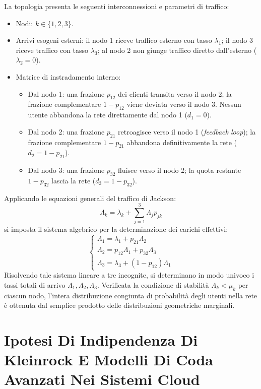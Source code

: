 \documentclass[11pt, a4paper]{article}
\begin{document}
La topologia presenta le seguenti interconnessioni e parametri di traffico:
\begin{itemize}[noitemsep]
    \item Nodi: $k \in \{1, 2, 3\}$.
    \item Arrivi esogeni esterni: il nodo 1 riceve traffico esterno con tasso $\lambda_1$; il nodo 3 riceve traffico con tasso $\lambda_3$; al nodo 2 non giunge traffico diretto dall'esterno ($\lambda_2 = 0$).
    \item Matrice di instradamento interno:
    \begin{itemize}[noitemsep]
        \item Dal nodo 1: una frazione $p_{12}$ dei clienti transita verso il nodo 2; la frazione complementare $1 - p_{12}$ viene deviata verso il nodo 3. Nessun utente abbandona la rete direttamente dal nodo 1 ($d_1 = 0$).
        \item Dal nodo 2: una frazione $p_{21}$ retroagisce verso il nodo 1 (\emph{feedback loop}); la frazione complementare $1 - p_{21}$ abbandona definitivamente la rete ($d_2 = 1 - p_{21}$).
        \item Dal nodo 3: una frazione $p_{32}$ fluisce verso il nodo 2; la quota restante $1 - p_{32}$ lascia la rete ($d_3 = 1 - p_{32}$).
    \end{itemize}
\end{itemize}
Applicando le equazioni generali del traffico di Jackson:
\[
\Lambda_k = \lambda_k + \sum_{j=1}^3 \Lambda_j p_{jk}
\]
si imposta il sistema algebrico per la determinazione dei carichi effettivi:
\[
\begin{cases}
\Lambda_1 = \lambda_1 + p_{21} \Lambda_2 \\
\Lambda_2 = p_{12} \Lambda_1 + p_{32} \Lambda_3 \\
\Lambda_3 = \lambda_3 + (1 - p_{12}) \Lambda_1
\end{cases}
\]
Risolvendo tale sistema lineare a tre incognite, si determinano in modo univoco i tassi totali di arrivo $\Lambda_1, \Lambda_2, \Lambda_3$. Verificata la condizione di stabilità $\Lambda_k < \mu_k$ per ciascun nodo, l'intera distribuzione congiunta di probabilità degli utenti nella rete è ottenuta dal semplice prodotto delle distribuzioni geometriche marginali.

\newpage

\section{Ipotesi Di Indipendenza Di Kleinrock E Modelli Di Coda Avanzati Nei Sistemi Cloud}
\end{document}

